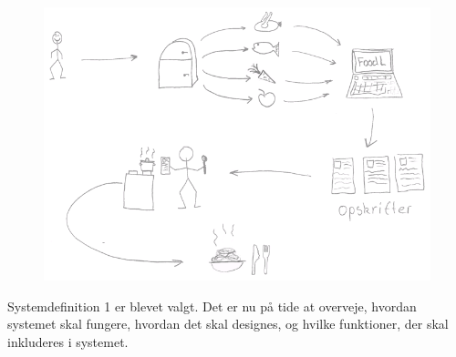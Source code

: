 \begin{figure}
	\centering
	\includegraphics[scale=0.6]{billeder/rigebilleder/anvendelsesomraade.png}
	\label{fig:rigbillede2}
\end{figure}

Systemdefinition 1 er blevet valgt. Det er nu på tide at overveje, hvordan systemet skal fungere, hvordan det skal designes, og hvilke funktioner, der skal inkluderes i systemet.

